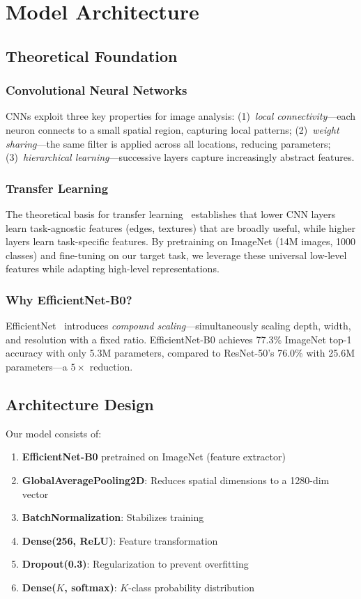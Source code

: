 \documentclass[12pt, a4paper]{article}
\begin{document}
\section{Model Architecture}

\subsection{Theoretical Foundation}

\subsubsection{Convolutional Neural Networks}
CNNs exploit three key properties for image analysis: (1)~\textit{local connectivity}---each neuron connects to a small spatial region, capturing local patterns; (2)~\textit{weight sharing}---the same filter is applied across all locations, reducing parameters; (3)~\textit{hierarchical learning}---successive layers capture increasingly abstract features.

\subsubsection{Transfer Learning}
The theoretical basis for transfer learning~\cite{yosinski2014} establishes that lower CNN layers learn task-agnostic features (edges, textures) that are broadly useful, while higher layers learn task-specific features. By pretraining on ImageNet (14M images, 1000 classes) and fine-tuning on our target task, we leverage these universal low-level features while adapting high-level representations.

\subsubsection{Why EfficientNet-B0?}
EfficientNet~\cite{tan2019} introduces \textit{compound scaling}---simultaneously scaling depth, width, and resolution with a fixed ratio. EfficientNet-B0 achieves 77.3\% ImageNet top-1 accuracy with only 5.3M parameters, compared to ResNet-50's 76.0\% with 25.6M parameters---a $5\times$ reduction.

\subsection{Architecture Design}

Our model consists of:
\begin{enumerate}[noitemsep]
    \item \textbf{EfficientNet-B0} pretrained on ImageNet (feature extractor)
    \item \textbf{GlobalAveragePooling2D}: Reduces spatial dimensions to a 1280-dim vector
    \item \textbf{BatchNormalization}: Stabilizes training
    \item \textbf{Dense(256, ReLU)}: Feature transformation
    \item \textbf{Dropout(0.3)}: Regularization to prevent overfitting
    \item \textbf{Dense($K$, softmax)}: $K$-class probability distribution
\end{enumerate}
\end{document}
